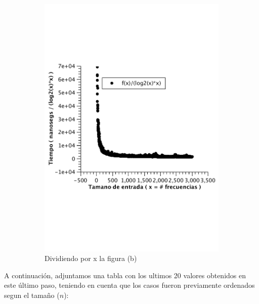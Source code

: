 \begin{figure}[H]
        \begin{subfigure}[b]{0.5\textwidth}
                \includegraphics[width=\textwidth]{imagenes/af-wc-const.pdf}
                \caption{Dividiendo por x la figura (b)}
        \end{subfigure}
        \caption{}
\end{figure}



A continuación, adjuntamos una tabla con los ultimos 20 valores obtenidos en este último paso, teniendo en cuenta que los casos fueron previamente ordenados segun el tamaño ($n$):

